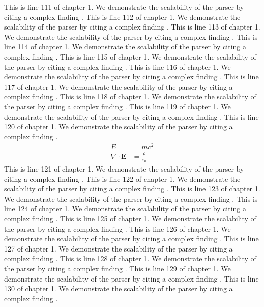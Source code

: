 This is line 111 of chapter 1. We demonstrate the scalability of the parser by citing a complex finding \cite{ref1_111}.
This is line 112 of chapter 1. We demonstrate the scalability of the parser by citing a complex finding \cite{ref1_112}.
This is line 113 of chapter 1. We demonstrate the scalability of the parser by citing a complex finding \cite{ref1_113}.
This is line 114 of chapter 1. We demonstrate the scalability of the parser by citing a complex finding \cite{ref1_114}.
This is line 115 of chapter 1. We demonstrate the scalability of the parser by citing a complex finding \cite{ref1_115}.
This is line 116 of chapter 1. We demonstrate the scalability of the parser by citing a complex finding \cite{ref1_116}.
This is line 117 of chapter 1. We demonstrate the scalability of the parser by citing a complex finding \cite{ref1_117}.
This is line 118 of chapter 1. We demonstrate the scalability of the parser by citing a complex finding \cite{ref1_118}.
This is line 119 of chapter 1. We demonstrate the scalability of the parser by citing a complex finding \cite{ref1_119}.
This is line 120 of chapter 1. We demonstrate the scalability of the parser by citing a complex finding \cite{ref1_120}.
\begin{align*}
  E &= mc^2 \\
  \nabla \cdot \mathbf{E} &= \frac{\rho}{\varepsilon_0}
\end{align*}
This is line 121 of chapter 1. We demonstrate the scalability of the parser by citing a complex finding \cite{ref1_121}.
This is line 122 of chapter 1. We demonstrate the scalability of the parser by citing a complex finding \cite{ref1_122}.
This is line 123 of chapter 1. We demonstrate the scalability of the parser by citing a complex finding \cite{ref1_123}.
This is line 124 of chapter 1. We demonstrate the scalability of the parser by citing a complex finding \cite{ref1_124}.
This is line 125 of chapter 1. We demonstrate the scalability of the parser by citing a complex finding \cite{ref1_125}.
This is line 126 of chapter 1. We demonstrate the scalability of the parser by citing a complex finding \cite{ref1_126}.
This is line 127 of chapter 1. We demonstrate the scalability of the parser by citing a complex finding \cite{ref1_127}.
This is line 128 of chapter 1. We demonstrate the scalability of the parser by citing a complex finding \cite{ref1_128}.
This is line 129 of chapter 1. We demonstrate the scalability of the parser by citing a complex finding \cite{ref1_129}.
This is line 130 of chapter 1. We demonstrate the scalability of the parser by citing a complex finding \cite{ref1_130}.
